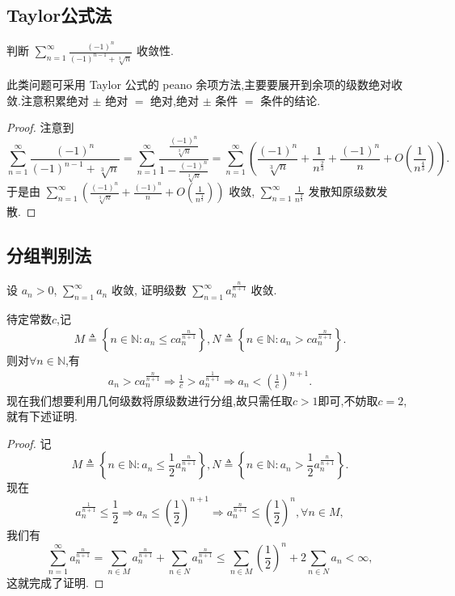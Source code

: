 \documentclass[../../main.tex]{subfiles}
\begin{document}
\subsection{Taylor公式法}

\begin{example}
判断 $\sum_{n=1}^{\infty} \frac{(-1)^n}{(-1)^{n - 1} + \sqrt[3]{n}}$ 收敛性.
\end{example}
\begin{note}
此类问题可采用 Taylor 公式的 peano 余项方法,主要要展开到余项的级数绝对收敛.注意积累绝对 $\pm$ 绝对 $=$ 绝对,绝对 $\pm$ 条件 $=$ 条件的结论.
\end{note}
\begin{proof}
注意到
\[
\sum_{n=1}^{\infty} \frac{(-1)^n}{(-1)^{n - 1} + \sqrt[3]{n}} = \sum_{n=1}^{\infty} \frac{\frac{(-1)^n}{\sqrt[3]{n}}}{1 - \frac{(-1)^n}{\sqrt[3]{n}}} = \sum_{n=1}^{\infty} \left( \frac{(-1)^n}{\sqrt[3]{n}} + \frac{1}{n^{\frac{2}{3}}} + \frac{(-1)^n}{n} + O \left( \frac{1}{n^{\frac{4}{3}}} \right) \right).
\]
于是由 $\sum_{n=1}^{\infty} \left( \frac{(-1)^n}{\sqrt[3]{n}} + \frac{(-1)^n}{n} + O \left( \frac{1}{n^{\frac{4}{3}}} \right) \right)$ 收敛, $\sum_{n=1}^{\infty} \frac{1}{n^{\frac{2}{3}}}$ 发散知原级数发散.
\end{proof}



\subsection{分组判别法}

\begin{example}
设 $a_n > 0$, $\sum_{n=1}^{\infty} a_n$ 收敛, 证明级数 $\sum_{n=1}^{\infty} a_n^{\frac{n}{n + 1}}$ 收敛.
\end{example}
\begin{note}
待定常数$c$,记
\[
M\triangleq \left\{ n\in \mathbb{N} :a_n\leqslant ca_{n}^{\frac{n}{n+1}} \right\} ,N\triangleq \left\{ n\in \mathbb{N} :a_n>ca_{n}^{\frac{n}{n+1}} \right\} .
\]
则对$\forall n\in \mathbb{N}$,有
\begin{align*}
a_n>ca_{n}^{\frac{n}{n+1}}\Rightarrow \frac{1}{c}>a_{n}^{\frac{1}{n+1}} \Rightarrow a_n<\left( \frac{1}{c} \right) ^{n+1}.
\end{align*}
现在我们想要利用几何级数将原级数进行分组,故只需任取$c>1$即可,不妨取$c=2$,就有下述证明.
\end{note}
\begin{proof}
记
\[
M \triangleq \left\{ n \in \mathbb{N} : a_n \leqslant \frac{1}{2} a_n^{\frac{n}{n + 1}} \right\}, N \triangleq \left\{ n \in \mathbb{N} : a_n > \frac{1}{2} a_n^{\frac{n}{n + 1}} \right\}.
\]
现在
\[
a_n^{\frac{1}{n + 1}} \leqslant \frac{1}{2} \Rightarrow a_n \leqslant \left( \frac{1}{2} \right)^{n + 1} \Rightarrow a_n^{\frac{n}{n + 1}} \leqslant \left( \frac{1}{2} \right)^n, \forall n \in M,
\]
我们有
\[
\sum_{n=1}^{\infty} a_n^{\frac{n}{n + 1}} = \sum_{n \in M} a_n^{\frac{n}{n + 1}} + \sum_{n \in N} a_n^{\frac{n}{n + 1}} \leqslant \sum_{n \in M} \left( \frac{1}{2} \right)^n + 2 \sum_{n \in N} a_n < \infty,
\]
这就完成了证明.
\end{proof}
\end{document}
